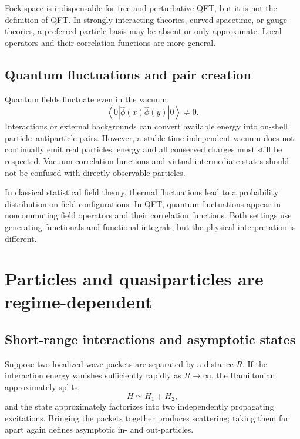 \documentclass[11pt]{article}
\newcommand{\avg}[1]{\left\langle #1\right\rangle}
\begin{document}
Fock space is indispensable for free and perturbative QFT, but it is not the
definition of QFT.  In strongly interacting theories, curved spacetime, or
gauge theories, a preferred particle basis may be absent or only
approximate.  Local operators and their correlation functions are more
general.

\subsection{Quantum fluctuations and pair creation}

Quantum fields fluctuate even in the vacuum:
\begin{equation}
  \avg{0|\hat\phi(x)\hat\phi(y)|0}\neq0.
\end{equation}
Interactions or external backgrounds can convert available energy into
on-shell particle--antiparticle pairs.  However, a stable time-independent
vacuum does not continually emit real particles: energy and all conserved
charges must still be respected.  Vacuum correlation functions and virtual
intermediate states should not be confused with directly observable
particles.

\begin{remarkbox}
In classical statistical field theory, thermal fluctuations lead to a
probability distribution on field configurations.  In QFT, quantum
fluctuations appear in noncommuting field operators and their correlation
functions.  Both settings use generating functionals and functional
integrals, but the physical interpretation is different.
\end{remarkbox}

\section{Particles and quasiparticles are regime-dependent}

\subsection{Short-range interactions and asymptotic states}

Suppose two localized wave packets are separated by a distance $R$.  If the
interaction energy vanishes sufficiently rapidly as $R\to\infty$, the
Hamiltonian approximately splits,
\begin{equation}
  H\simeq H_1+H_2,
\end{equation}
and the state approximately factorizes into two independently propagating
excitations.  Bringing the packets together produces scattering; taking
them far apart again defines asymptotic in- and out-particles.
\end{document}
